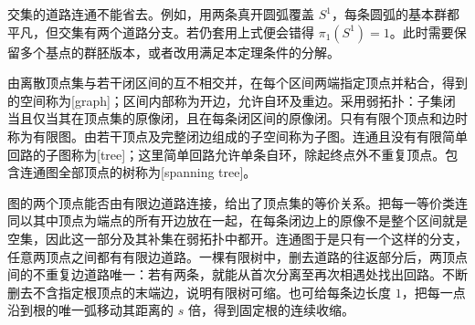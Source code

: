 交集的道路连通不能省去。例如，用两条真开圆弧覆盖 \(S^1\)，每条圆弧的基本群都平凡，但交集有两个道路分支。若仍套用上式便会错得 \(\pi_1(S^1)=1\)。此时需要保留多个基点的群胚版本，或者改用满足本定理条件的分解。

\begin{definition}[图与生成树]\label{g2:def:graph-tree}
	由离散顶点集与若干闭区间的互不相交并，在每个区间两端指定顶点并粘合，得到的空间称为[graph]；区间内部称为开边，允许自环及重边。采用弱拓扑：子集闭当且仅当其在顶点集的原像闭，且在每条闭区间的原像闭。只有有限个顶点和边时称为有限图。由若干顶点及完整闭边组成的子空间称为子图。连通且没有有限简单回路的子图称为[tree]；这里简单回路允许单条自环，除起终点外不重复顶点。包含连通图全部顶点的树称为[spanning tree]。
\end{definition}

图的两个顶点能否由有限边道路连接，给出了顶点集的等价关系。把每一等价类连同以其中顶点为端点的所有开边放在一起，在每条闭边上的原像不是整个区间就是空集，因此这一部分及其补集在弱拓扑中都开。连通图于是只有一个这样的分支，任意两顶点之间都有有限边道路。一棵有限树中，删去道路的往返部分后，两顶点间的不重复边道路唯一：若有两条，就能从首次分离至再次相遇处找出回路。不断删去不含指定根顶点的末端边，说明有限树可缩。也可给每条边长度 \(1\)，把每一点沿到根的唯一弧移动其距离的 \(s\) 倍，得到固定根的连续收缩。

